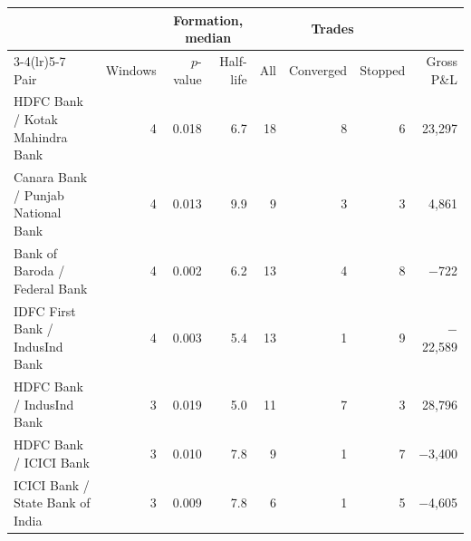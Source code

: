 \begin{tabular}{@{}lrrrrrrr@{}}
\toprule
 & & \multicolumn{2}{c}{Formation, median} & \multicolumn{3}{c}{Trades} & \\
\cmidrule(lr){3-4}\cmidrule(lr){5-7}
Pair & Windows & $p$-value & Half-life & All & Converged & Stopped & Gross P\&L \\
\midrule
HDFC Bank / Kotak Mahindra Bank & 4 & 0.018 & 6.7 & 18 & 8 & 6 & 23{,}297 \\
Canara Bank / Punjab National Bank & 4 & 0.013 & 9.9 & 9 & 3 & 3 & 4{,}861 \\
Bank of Baroda / Federal Bank & 4 & 0.002 & 6.2 & 13 & 4 & 8 & \ensuremath{-}722 \\
IDFC First Bank / IndusInd Bank & 4 & 0.003 & 5.4 & 13 & 1 & 9 & \ensuremath{-}22{,}589 \\
HDFC Bank / IndusInd Bank & 3 & 0.019 & 5.0 & 11 & 7 & 3 & 28{,}796 \\
HDFC Bank / ICICI Bank & 3 & 0.010 & 7.8 & 9 & 1 & 7 & \ensuremath{-}3{,}400 \\
ICICI Bank / State Bank of India & 3 & 0.009 & 7.8 & 6 & 1 & 5 & \ensuremath{-}4{,}605 \\
\bottomrule
\end{tabular}
